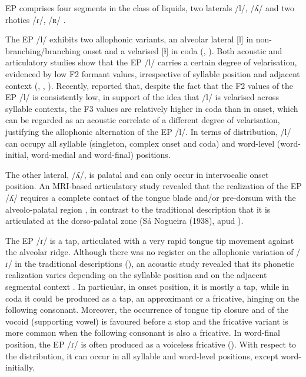 \documentclass[output=paper]{../langscibook}
\begin{document}
EP comprises four segments in the class of liquids, two laterals /l/, /ʎ/ and two rhotics /ɾ/, /ʀ/ \citep{MateusEtAl2016}.

The EP /l/ exhibits two allophonic variants, an alveolar lateral [l] in non-bran\-ching\slash branching onset and a velarised [ɫ] in coda (\citealt{MateusAndrade2000}, \citealt{MateusEtAl2016}). Both acoustic and articulatory studies show that the EP /l/ carries a certain degree of velarisation, evidenced by low F2 formant values, irrespective of syllable position and adjacent context (\citealt{Andrade1998}, \citealt{Marques2010}, \citealt{OliveiraEtAl2011}). Recently, \citet{RodriguesEtAl2019} reported that, despite the fact that the F2 values of the EP /l/ is consistently low, in support of the idea that /l/ is velarised across syllable contexts, the F3 values are relatively higher in coda than in onset, which can be regarded as an acoustic correlate of a different degree of velarisation, justifying the allophonic alternation of the EP /l/. In terms of distribution, /l/ can occupy all syllable (singleton, complex onset and coda) and word-level (word-initial, word-medial and word-final) positions.

The other lateral, /ʎ/, is palatal and can only occur in intervocalic onset position. An MRI-based articulatory study revealed that the realization of the EP /ʎ/ requires a complete contact of the tongue blade and/or pre-dorsum with the alveolo-palatal region \citep{TeixeiraEtAl2012}, in contrast to the traditional description that it is articulated at the dorso-palatal zone (Sá Nogueira (1938), apud \citealt{MateusAndrade2000}).

The EP /ɾ/ is a tap, articulated with a very rapid tongue tip movement against the alveolar ridge. Although there was no register on the allophonic variation of /ɾ/ in the traditional descriptions (\citealt{MateusAndrade2000}), an acoustic study revealed that its phonetic realization varies depending on the syllable position and on the adjacent segmental context \citep{Silva2014}. In particular, in onset position, it is mostly a tap, while in coda it could be produced as a tap, an approximant or a fricative, hinging on the following consonant. Moreover, the occurrence of tongue tip closure and of the vocoid (supporting vowel) is favoured before a stop and the fricative variant is more common when the following consonant is also a fricative. In word-final position, the EP /ɾ/ is often produced as a voiceless fricative (\citealt{JesusShadle2005}). With respect to the distribution, it can occur in all syllable and word-level positions, except word-initially.
\end{document}
